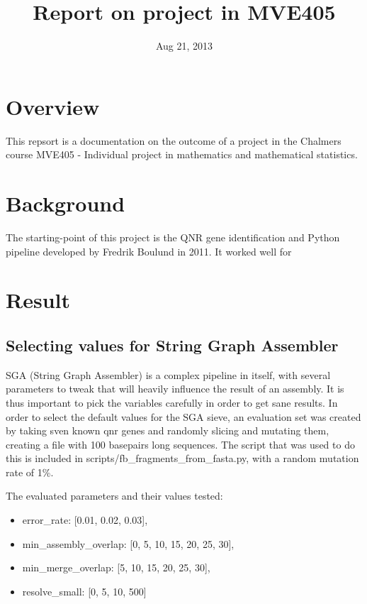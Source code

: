 \documentclass[a4paper,12pt]{article}
\title {Report on project in MVE405}
\date {Aug 21, 2013}
\begin{document}
\maketitle

\section{Overview}
This repsort is a documentation on the outcome of a project in the Chalmers course MVE405 - Individual project in mathematics and mathematical statistics.

\section{Background}
The starting-point of this project is the QNR gene identification and Python pipeline developed by Fredrik Boulund in 2011. It worked well for 

\section{Result}
\subsection{Selecting values for String Graph Assembler}
SGA (String Graph Assembler) is a complex pipeline in itself, with several parameters to tweak that will heavily influence the result of an assembly. It is thus important to pick the variables carefully in order to get sane results. In order to select the default values for the SGA sieve, an evaluation set was created by taking sven known qnr genes and randomly slicing and mutating them, creating a file with 100 basepairs long sequences. The script that was used to do this is included in scripts/fb\_fragments\_from\_fasta.py, with a random mutation rate of 1\%.

The evaluated parameters and their values tested:
\begin{itemize}
\item
error\_rate: [0.01, 0.02, 0.03],
\item
min\_assembly\_overlap: [0, 5, 10, 15, 20, 25, 30],
\item
min\_merge\_overlap: [5, 10, 15, 20, 25, 30],
\item
resolve\_small: [0, 5, 10, 500]
\end{itemize}
\end{document}
